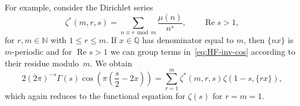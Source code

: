\documentclass[11pt,a4paper,reqno]{amsart}
\newcommand{\N}{\mathbb{N}}
\newcommand{\Q}{\mathbb{Q}}
\renewcommand{\Re}{\operatorname{Re}}
\theoremstyle{plain}
\theoremstyle{remark}
\numberwithin{equation}{section}
\begin{document}
For example, consider the Dirichlet series
%
\begin{equation*}
		  \zeta^{*}(m,r,s)
		= \sum_{n \equiv r \bmod m} \frac{\mu(n)}{n^{s}},
		\qquad
		\Re s > 1,
\end{equation*}
%
for $r,m \in \N$ with $1 \leq r \leq m$.
If $x \in \Q$ has denominator equal to $m$, then $\{nx\}$ is $m$-periodic and for $\Re s > 1$ we can group terms in~\eqref{eq:HF-inv-cos} according to their residue modulo~$m$. We obtain
%
\begin{equation*}
	   2 (2 \pi)^{-s} \Gamma(s) \cos\left(\pi\left(\frac{s}{2} - 2 x\right)\right)
	= \sum_{r=1}^{m} \zeta^{*}(m,r,s) \zeta(1-s,\{rx\}),
\end{equation*}
%
which again reduces to the functional equation for $\zeta(s)$ for $r = m = 1$.
\end{document}
